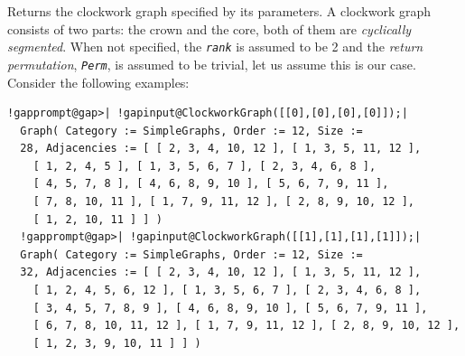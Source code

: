 \documentclass[a4paper,11pt]{report}
\begin{document}
{{{ 

Returns the clockwork graph \cite{LN02}\cite{LNP04} specified by its parameters. A clockwork graph consists of two parts: the
crown and the core, both of them are \emph{cyclically segmented}. When not specified, the \mbox{\texttt{\mdseries\slshape rank}} is assumed to be 2 and the \emph{return permutation}, \mbox{\texttt{\mdseries\slshape Perm}}, is assumed to be trivial, let us assume this is our case. Consider the
following examples: 

 
\begin{Verbatim}[commandchars=!@|,fontsize=\small,frame=single,label=Example]
  !gapprompt@gap>| !gapinput@ClockworkGraph([[0],[0],[0],[0]]);|
  Graph( Category := SimpleGraphs, Order := 12, Size := 
  28, Adjacencies := [ [ 2, 3, 4, 10, 12 ], [ 1, 3, 5, 11, 12 ], 
    [ 1, 2, 4, 5 ], [ 1, 3, 5, 6, 7 ], [ 2, 3, 4, 6, 8 ], 
    [ 4, 5, 7, 8 ], [ 4, 6, 8, 9, 10 ], [ 5, 6, 7, 9, 11 ], 
    [ 7, 8, 10, 11 ], [ 1, 7, 9, 11, 12 ], [ 2, 8, 9, 10, 12 ], 
    [ 1, 2, 10, 11 ] ] )
  !gapprompt@gap>| !gapinput@ClockworkGraph([[1],[1],[1],[1]]);|
  Graph( Category := SimpleGraphs, Order := 12, Size := 
  32, Adjacencies := [ [ 2, 3, 4, 10, 12 ], [ 1, 3, 5, 11, 12 ], 
    [ 1, 2, 4, 5, 6, 12 ], [ 1, 3, 5, 6, 7 ], [ 2, 3, 4, 6, 8 ], 
    [ 3, 4, 5, 7, 8, 9 ], [ 4, 6, 8, 9, 10 ], [ 5, 6, 7, 9, 11 ], 
    [ 6, 7, 8, 10, 11, 12 ], [ 1, 7, 9, 11, 12 ], [ 2, 8, 9, 10, 12 ], 
    [ 1, 2, 3, 9, 10, 11 ] ] )
\end{Verbatim}
 

}}}
\end{document}
